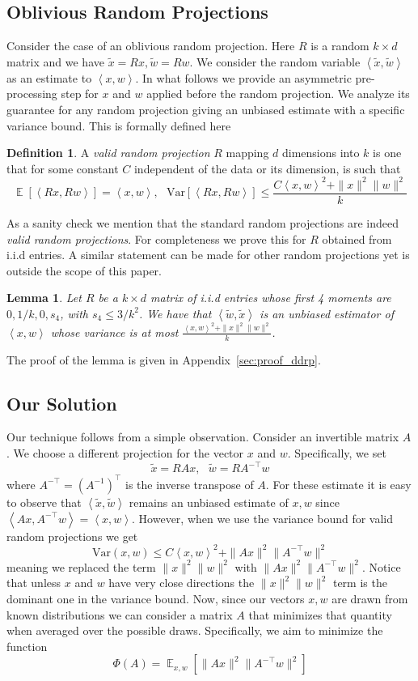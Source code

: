 \documentclass{article}
\newtheorem{lemma}[theorem]{Lemma}
\theoremstyle{definition}
\newtheorem{definition}[theorem]{Definition}
\theoremstyle{plain}
\newcommand{\Var}{\text{Var}}
\DeclareMathOperator{\E}{\mathbb{E}}
\newcommand{\ip}[1]{\left \langle #1 \right \rangle}
\begin{document}
\subsection{Oblivious Random Projections}
Consider the case of an oblivious random projection. Here $R$ is a random $k \times d$ matrix and we have $\tilde{x} = Rx, \tilde{w} = Rw$. We consider the random variable $\ip{\tilde{x}, \tilde{w}}$ as an estimate to $\ip{x,w}$. In what follows we provide an asymmetric pre-processing step for $x$ and $w$ applied before the random projection. We analyze its guarantee for any random projection giving an unbiased estimate with a specific variance bound. This is formally defined here

\begin{definition}
A \emph{valid random projection} $R$ mapping $d$ dimensions into $k$ is one that for some constant $C$ independent of the data or its 
dimension, is such that 
$$ \E[\ip{Rx,Rw}] = \ip{x,w} , \ \ \  \Var[\ip{Rx,Rw}] \leq \frac{C \ip{x,w}^2 + \|x\|^2\|w\|^2}{k} $$
\end{definition}

As a sanity check we mention that the standard random projections are indeed \emph{valid random projections}. For completeness we prove this for $R$ obtained from i.i.d entries. A similar statement can be made for other random projections yet is outside the scope of this paper.
\begin{lemma} \label{lem:iid_rp}
Let $R$ be a $k \times d$ matrix of i.i.d entries whose first 4 moments are $0,1/k,0,s_4$, with $s_4 \leq 3/k^2$. We have that $\ip{\tilde{w},\tilde{x}}$ is an unbiased estimator of $\ip{x,w}$ whose variance is at most $\frac{\ip{x,w}^2 + \|x\|^2\|w\|^2}{k}$.
\end{lemma}
The proof of the lemma is given in Appendix~\ref{sec:proof_ddrp}.


\subsection{Our Solution}
Our technique follows from a simple observation. Consider an invertible matrix $A$. We choose a different projection for the vector $x$ and $w$. Specifically, we set 
$$ \tilde{x} = RAx, \ \ \ \tilde{w} = RA^{-\top}w $$
where $A^{-\top} = (A^{-1})^\top$ is the inverse transpose of $A$. For these estimate it is easy to observe that $\ip{\tilde{x},\tilde{w}}$ remains an unbiased estimate of $x,w$ since $\ip{Ax, A^{-\top}w}=\ip{x,w}$. However, when we use the variance bound for valid random projections we get 
$$\Var(x,w) \leq C \ip{x,w}^2 + \|Ax\|^2\|A^{-\top}w\|^2$$
meaning we replaced the term $\|x\|^2\|w\|^2$ with $\|Ax\|^2 \|A^{-\top}w\|^2$. Notice that unless $x$ and $w$ have very close directions the $\|x\|^2\|w\|^2$ term is the dominant one in the variance bound.  Now, since our vectors $x,w$ are drawn from known distributions we can consider a matrix $A$ that minimizes that quantity when averaged over the possible draws. Specifically, we aim to minimize the function
$$\Phi(A) = \E_{x,w}\left[\|Ax\|^2\|A^{-\top}w\|^2\right]$$
\end{document}
